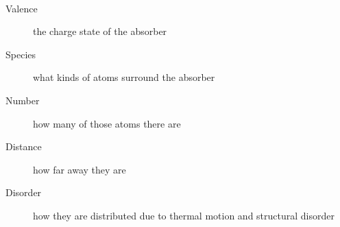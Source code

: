 \documentclass[10pt, xcolor=x11names, compress]{beamer}
\begin{document}
\begin{frame}
\begin{columns}
\begin{column}{0.30\linewidth}
    \end{column}
    \begin{column}{0.125\linewidth}
      ~
    \end{column}
  \end{columns}

  \medskip

  \begin{description}
  \item[Valence] the charge state of the absorber
  \item[Species] what kinds of atoms surround the absorber
  \item[Number] how many of those atoms there are
  \item[Distance] how far away they are
  \item[Disorder] how they are distributed due to thermal motion and
    structural disorder
  \end{description}
\end{frame}
\end{document}
